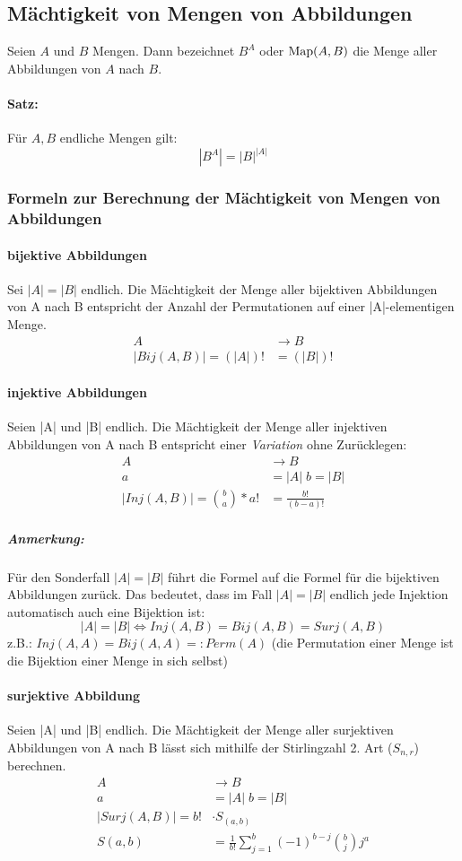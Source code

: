 \subsection{Mächtigkeit von Mengen von Abbildungen}
Seien $A$ und $B$ Mengen.
Dann bezeichnet $B^A$ oder $\text{Map}(A,B)$ die Menge aller Abbildungen von $A$
nach $B$. \paragraph*{Satz:}
Für $A, B$ endliche Mengen gilt:
$$ |B^A| = {|B|}^{|A|} $$

\subsubsection{Formeln zur Berechnung der Mächtigkeit von Mengen von Abbildungen}
\paragraph*{bijektive Abbildungen}
Sei $|A|=|B|$ endlich. Die Mächtigkeit der Menge aller bijektiven
Abbildungen von A nach B entspricht der Anzahl der Permutationen auf
einer |A|-elementigen Menge.
\begin{align*}
  A &\rightarrow B \\
  |Bij(A,B)| = (|A|)! &= (|B|)!
\end{align*}

\paragraph*{injektive Abbildungen}
Seien |A| und |B| endlich. Die Mächtigkeit der Menge aller injektiven
Abbildungen von A nach B entspricht einer \emph{Variation} ohne Zurücklegen:
\begin{align*}
  A &\rightarrow B \\
  a &= |A| \; b = |B| \\
  |Inj(A,B)| =
{{b}\choose{a}} * a!
  &= \frac{b!}{(b-a)!}
\end{align*}

\subparagraph*{Anmerkung:} Für den Sonderfall $|A|=|B|$ führt die Formel auf die Formel für die bijektiven Abbildungen zurück. Das bedeutet, dass im Fall $|A|=|B|$ endlich jede Injektion
automatisch auch eine Bijektion ist:
$$|A|=|B| \Longleftrightarrow Inj(A,B) = Bij(A,B) = Surj(A,B)$$
z.B.: $ Inj(A,A) = Bij(A,A) =: Perm(A) $
(die Permutation einer Menge ist die Bijektion einer Menge in sich selbst)

\paragraph*{surjektive Abbildung}
Seien |A| und |B| endlich. Die Mächtigkeit der Menge aller surjektiven
Abbildungen von A nach B lässt sich mithilfe der
Stirlingzahl 2. Art ($S_{n,r}$) berechnen.
\begin{align*}
  A &\rightarrow B \\
  a &= |A| \; b = |B| \\
  |Surj(A,B)| =
  b!    &\cdot S_{(a,b)}\\
  S(a,b)&=\frac{1}{b!}\sum_{j=1}^{b}(-1)^{b-j}{b \choose j}j^a
\end{align*}

